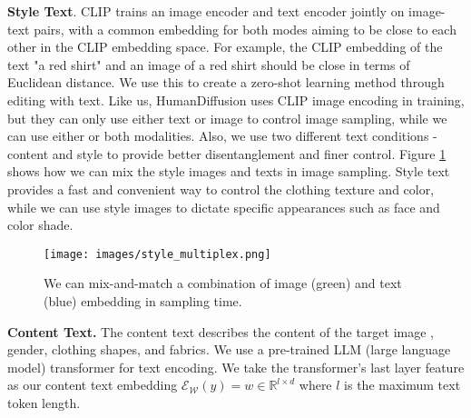 \documentclass[10pt,twocolumn,letterpaper]{article}
\begin{document}
\noindent\textbf{Style Text}. CLIP \cite{clip} trains an image encoder and text encoder jointly on image-text pairs, with a common embedding for both modes aiming to be close to each other in the CLIP embedding space. For example, the CLIP embedding of the text "a red shirt" and an image of a red shirt should be close in terms of Euclidean distance. We use this to create a zero-shot learning method through editing with text. Like us, HumanDiffusion\cite{human_diffusion} uses CLIP image encoding in training, but they can only use either text or image to control image sampling, while we can use either or both modalities. Also, we use two different text conditions - content and style to provide better disentanglement and finer control. Figure \ref{fig:style_mix} shows how we can mix the style images and texts in image sampling. Style text provides a fast and convenient way to control the clothing texture and color, while we can use style images to dictate specific appearances such as face and color shade.  

\begin{figure}[h]
    \vspace{-2mm}
    \begin{center}
        \texttt{[image: images/style\_multiplex.png]}
    \end{center}
    \vspace{-2mm}
    \caption{We can mix-and-match a combination of image (green) and text (blue) embedding in sampling time.}
    \label{fig:style_mix}
\end{figure}


\noindent\textbf{Content Text.} The content text describes the content of the target image \eg, gender, clothing shapes, and fabrics. We use a pre-trained LLM (large language model) transformer \cite{huggingface_llm} for text encoding. We take the transformer's last layer feature as our content text embedding $\mathcal{E_W}(y)=w \in \mathbb{R}^{l \times d}$ where $l$ is the maximum text token length. 
\end{document}
